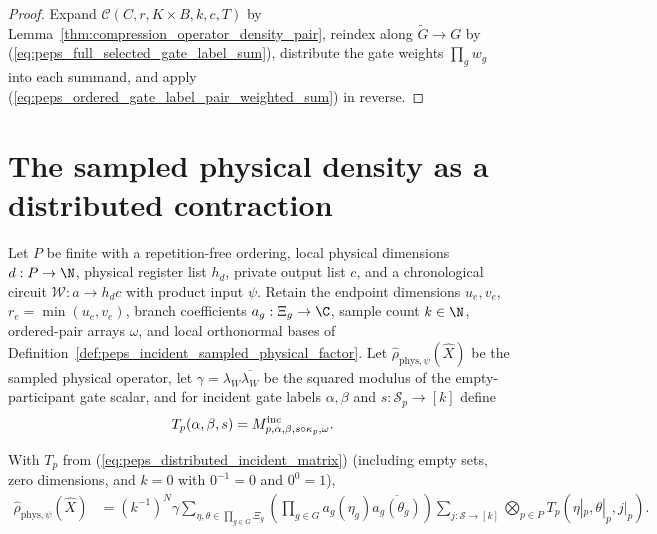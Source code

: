 \begin{proof}
    \leanok
    Expand $\mathcal C(C,r,K\times B,k,c,T)$ by Lemma~\ref{thm:compression_operator_density_pair}, reindex along $\widetilde G\to G$ by (\ref{eq:peps_full_selected_gate_label_sum}), distribute the gate weights $\prod_g w_g$ into each summand, and apply (\ref{eq:peps_ordered_gate_label_pair_weighted_sum}) in reverse.
\end{proof}

\section{The sampled physical density as a distributed contraction}
\label{sec:peps_actual_sampled_distributed_contraction}

Let $P$ be finite with a repetition-free ordering, local physical dimensions $d:P\to\N$, physical register list $h_d$, private output list $c$, and a chronological circuit $\mathcal W:a\to h_dc$ with product input $\psi$.
Retain the endpoint dimensions $u_e,v_e$, $r_e=\min(u_e,v_e)$, branch coefficients $a_g:\Xi_g\to\C$, sample count $k\in\N$, ordered-pair arrays $\omega$, and local orthonormal bases of Definition~\ref{def:peps_incident_sampled_physical_factor}.
Let $\widehat\rho_{\mathrm{phys},\psi}(\widehat X)$ be the sampled physical operator, let $\gamma=\lambda_W\overline{\lambda_W}$ be the squared modulus of the empty-participant gate scalar, and for incident gate labels $\alpha,\beta$ and $s:\mathcal S_p\to[k]$ define
\begin{align}
    T_p(\alpha,\beta,s)
     & =M^{\rm inc}_{p,\alpha,\beta,s\circ\kappa_p,\omega}.
    \label{eq:peps_distributed_incident_matrix}
\end{align}

\begin{lemma}
    \label{thm:peps_original_gate_sample_physical_sum}
    \leanok
    With $T_p$ from (\ref{eq:peps_distributed_incident_matrix}) (including empty sets, zero dimensions, and $k=0$ with $0^{-1}=0$ and $0^0=1$),
    \begin{align}
        \widehat\rho_{\mathrm{phys},\psi}(\widehat X)
         & =(k^{-1})^N\gamma
        \sum_{\eta,\theta\in\prod_{g\in G}\Xi_g}
        \left(\prod_{g\in G}a_g(\eta_g)\overline{a_g(\theta_g)}\right)
        \sum_{j:\mathcal S\to[k]}
        \bigotimes_{p\in P}T_p(\eta|_p,\theta|_p,j|_p).
        \label{eq:peps_original_gate_sample_physical_sum}
    \end{align}
\end{lemma}

